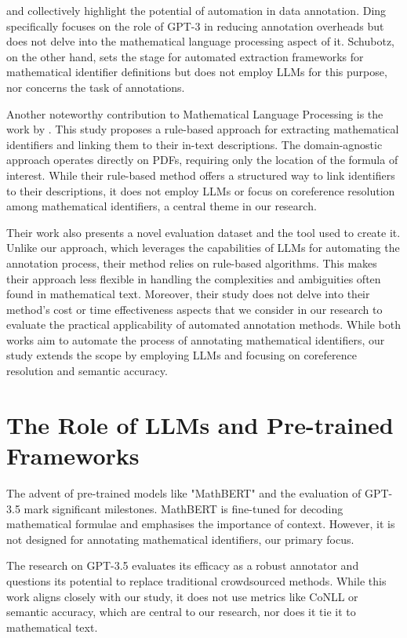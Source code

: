 \citet{ding2022gpt} and \citet{schubotz2017evaluating} collectively highlight the potential of automation in data annotation. Ding specifically focuses on the role of GPT-3 in reducing annotation overheads but does not delve into the mathematical language processing aspect of it. Schubotz, on the other hand, sets the stage for automated extraction frameworks for mathematical identifier definitions but does not employ \ac{LLMs} for this purpose, nor concerns the task of annotations.

Another noteworthy contribution to Mathematical Language Processing is the work by \citet{alexeeva2020mathalign}. This study proposes a rule-based approach for extracting mathematical identifiers and linking them to their in-text descriptions. The domain-agnostic approach operates directly on PDFs, requiring only the location of the formula of interest. While their rule-based method offers a structured way to link identifiers to their descriptions, it does not employ LLMs or focus on coreference resolution among mathematical identifiers, a central theme in our research.

Their work also presents a novel evaluation dataset and the tool used to create it. Unlike our approach, which leverages the capabilities of LLMs for automating the annotation process, their method relies on rule-based algorithms. This makes their approach less flexible in handling the complexities and ambiguities often found in mathematical text. Moreover, their study does not delve into their method's cost or time effectiveness aspects that we consider in our research to evaluate the practical applicability of automated annotation methods. While both works aim to automate the process of annotating mathematical identifiers, our study extends the scope by employing LLMs and focusing on coreference resolution and semantic accuracy.


\section{The Role of LLMs and Pre-trained Frameworks}

The advent of pre-trained models like "MathBERT" \citep{peng2021mathbert} and the evaluation of GPT-3.5 \citep{he2023annollm} mark significant milestones. MathBERT is fine-tuned for decoding mathematical formulae and emphasises the importance of context. However, it is not designed for annotating mathematical identifiers, our primary focus.

The research on GPT-3.5 evaluates its efficacy as a robust annotator and questions its potential to replace traditional crowdsourced methods. While this work aligns closely with our study, it does not use metrics like CoNLL or semantic accuracy, which are central to our research, nor does it tie it to mathematical text.

